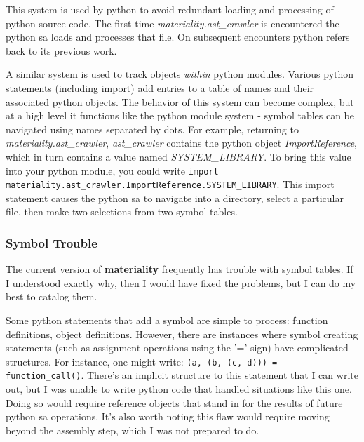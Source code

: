 \documentclass[a4paper,man,natbib,floatsintext]{apa6}
\begin{document}
  This system is used by \Gls{python} to avoid redundant loading and processing of \Gls{python} source code. The first time \textit{materiality.ast\_crawler} is encountered the \Gls{python} \gls{sa} loads and processes that file. On subsequent encounters \Gls{python} refers back to its previous work. 

  A similar system is used to track objects \textit{within} \Gls{python} modules. Various \Gls{python} statements (including import) add entries to a table of names and their associated \Gls{python} objects. The behavior of this system can become complex, but at a high level it functions like the \Gls{python} module system - symbol tables can be navigated using names separated by dots. For example, returning to \textit{materiality.ast\_crawler}, \textit{ast\_crawler} contains the \Gls{python} object \textit{ImportReference}, which in turn contains a value named \textit{SYSTEM\_LIBRARY}\footnotemark. To bring this value into your python module, you could write \verb|import materiality.ast_crawler.ImportReference.SYSTEM_LIBRARY|. This import statement causes the \Gls{python} \gls{sa} to navigate into a directory, select a particular file, then make two selections from two symbol tables. 


  \subsubsection{Symbol Trouble}
  The current version of \textbf{materiality} frequently has trouble with symbol tables. If I understood exactly why, then I would have fixed the problems, but I can do my best to catalog them.

  Some \Gls{python} statements that add a symbol are simple to process: function definitions, object definitions. However, there are instances where symbol creating statements (such as assignment operations using the '=' sign) have complicated structures. For instance, one might write: \verb|(a, (b, (c, d))) = function_call()|. There's an implicit structure to this statement that I can write out\footnotemark, but I was unable to write \Gls{python} code that handled situations like this one. Doing so would require reference objects that stand in for the results of future \Gls{python} \gls{sa} operations. It's also worth noting this flaw would require moving beyond the assembly step, which I was not prepared to do.
\end{document}
